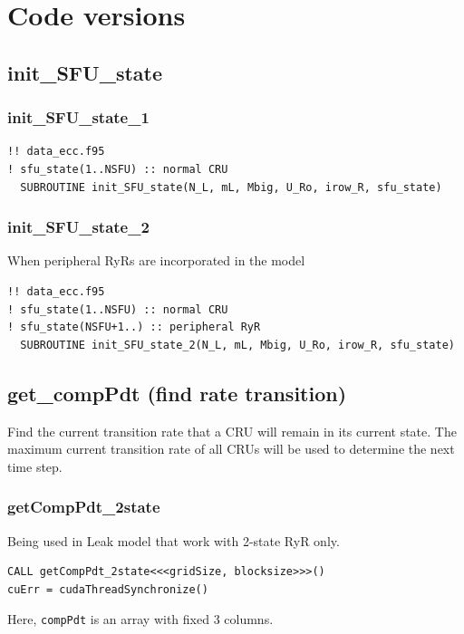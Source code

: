 \chapter{Code versions}
\label{chap:code_versions}

\section{init\_SFU\_state}
\label{sec:init_SFU_state}

\subsection{init\_SFU\_state\_1}
\label{sec:init_SFU_state_1}
  
\begin{verbatim}
!! data_ecc.f95
! sfu_state(1..NSFU) :: normal CRU
  SUBROUTINE init_SFU_state(N_L, mL, Mbig, U_Ro, irow_R, sfu_state)
\end{verbatim}

\subsection{init\_SFU\_state\_2}
\label{sec:init_SFU_state_2}

When peripheral RyRs are incorporated in the model 

\begin{verbatim}
!! data_ecc.f95
! sfu_state(1..NSFU) :: normal CRU
! sfu_state(NSFU+1..) :: peripheral RyR
  SUBROUTINE init_SFU_state_2(N_L, mL, Mbig, U_Ro, irow_R, sfu_state)
\end{verbatim}

\section{get\_compPdt (find rate transition)}
\label{sec:get_compPdt}

Find the current transition rate that a CRU will remain in its current
state. The maximum current transition rate of all CRUs will be used to determine
the next time step. 

\subsection{getCompPdt\_2state}
	
Being used in Leak model that work with 2-state RyR only. 
\begin{verbatim}
CALL getCompPdt_2state<<<gridSize, blocksize>>>()
cuErr = cudaThreadSynchronize()
\end{verbatim}
Here, \verb!compPdt! is an array with fixed 3 columns. 

